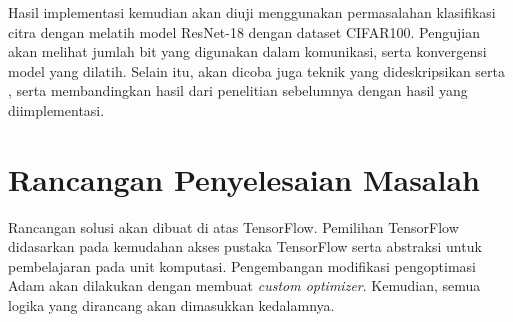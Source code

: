 Hasil implementasi kemudian akan diuji menggunakan permasalahan klasifikasi citra dengan melatih model ResNet-18 dengan dataset CIFAR100. Pengujian akan melihat jumlah bit yang digunakan dalam komunikasi, serta konvergensi model yang dilatih. Selain itu, akan dicoba juga teknik yang dideskripsikan \textcite{Chen2021CADA} serta \textcite{Chen2022Efficient}, serta membandingkan hasil dari penelitian sebelumnya dengan hasil yang diimplementasi.

\section{Rancangan Penyelesaian Masalah}
Rancangan solusi akan dibuat di atas TensorFlow. Pemilihan TensorFlow didasarkan pada kemudahan akses pustaka TensorFlow serta abstraksi untuk pembelajaran pada unit komputasi. Pengembangan modifikasi pengoptimasi Adam akan dilakukan dengan membuat \emph{custom optimizer}. Kemudian, semua logika yang dirancang akan dimasukkan kedalamnya.
